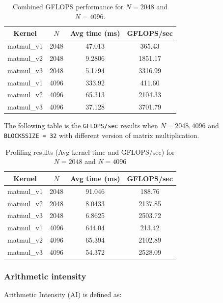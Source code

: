 \documentclass[11pt]{article}
\begin{document}
\begin{table}[H]
\centering
\begin{tabular}{|c|c|c|c|}
\hline
\textbf{Kernel}   & \boldmath$N$\unboldmath & \textbf{Avg time (ms)} & \textbf{GFLOPS/sec} \\ \hline
matmul\_v1        & 2048  & 47.013   & 365.43  \\ 
matmul\_v2        & 2048  & 9.2806   & 1851.17 \\ 
matmul\_v3        & 2048  & 5.1794   & 3316.99 \\ \hline
matmul\_v1        & 4096  & 333.92   & 411.60  \\ 
matmul\_v2        & 4096  & 65.313   & 2104.33 \\ 
matmul\_v3        & 4096  & 37.128   & 3701.79 \\ \hline
\end{tabular}
\caption{Combined GFLOPS performance for $N=2048$ and $N=4096$.}
\label{tab:matmul_gflops_updated}
\end{table}

The following table is the \verb|GFLOPS/sec| results when $N = 2048, 4096$ and \verb|BLOCKSSIZE = 32| with different version of matrix multiplication.

\begin{table}[H]
\centering
\begin{tabular}{|c|c|c|c|}
\hline
\textbf{Kernel}   & \boldmath$N$\unboldmath & \textbf{Avg time (ms)} & \textbf{GFLOPS/sec} \\ \hline
matmul\_v1        & 2048  & 91.046  & 188.76  \\ 
matmul\_v2        & 2048  & 8.0433  & 2137.85 \\ 
matmul\_v3        & 2048  & 6.8625  & 2503.72 \\ \hline
matmul\_v1        & 4096  & 644.04  & 213.42  \\ 
matmul\_v2        & 4096  & 65.394  & 2102.89 \\ 
matmul\_v3        & 4096  & 54.372  & 2528.09 \\ \hline
\end{tabular}
\caption{Profiling results (Avg kernel time and GFLOPS/sec) for $N=2048$ and $N=4096$}
\label{tab:matmul_gflops_combined}
\end{table}



\subsubsection{Arithmetic intensity}
Arithmetic Intensity (AI) is defined as:
\end{document}
